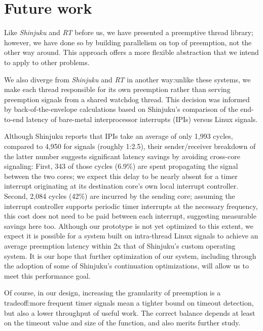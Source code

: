 \section{Future work}



Like \textit{Shinjuku} and \textit{RT} before us, we have presented a preemptive
thread library; however, we have done so by building parallelism on top of
preemption,
not the other way around.  This approach offers a more flexible abstraction that
we intend to apply to other problems.


We also diverge from \textit{Shinjuku} and \textit{RT}
in another way:\@ unlike these systems, we make each thread responsible for
its own preemption rather than serving preemption signals from a shared watchdog
thread.  This decision was informed by back-of-the-envelope calculations based on
Shinjuku's comparison of the end-to-end latency of bare-metal interprocessor
interrupts (IPIs) versus Linux signals.

Although Shinjuku reports that IPIs take an average of only 1,993 cycles, compared to
4,950 for signals (roughly 1:2.5), their sender/receiver breakdown of the latter
number suggests significant latency savings by avoiding cross-core signaling:
First, 343 of those cycles (6.9\%) are spent propagating the signal between the two
cores; we expect this delay to be nearly absent for a timer interrupt originating at
its destination core's own local interrupt controller.  Second, 2,084 cycles (42\%)
are incurred by the sending core; assuming the interrupt controller supports
periodic timer interrupts at the necessary frequency, this cost does not need to be
paid between each interrupt, suggesting measurable savings here too.  Although
our prototype is not yet optimized to this extent, we expect it is possible for a
system built on intra-thread Linux signals to achieve an average preemption latency
within 2x that of Shinjuku's custom operating system.  It is our hope that further
optimization of our system, including through the adoption of some of Shinjuku's
continuation optimizations, will allow us to meet this performance goal.

Of course, in our design, increasing the granularity of preemption is a tradeoff:\@ more
frequent timer signals mean a tighter bound on timeout detection, but also a lower
throughput of useful work.  The correct balance depends at least on the
timeout value and size of the function, and also merits further study.


